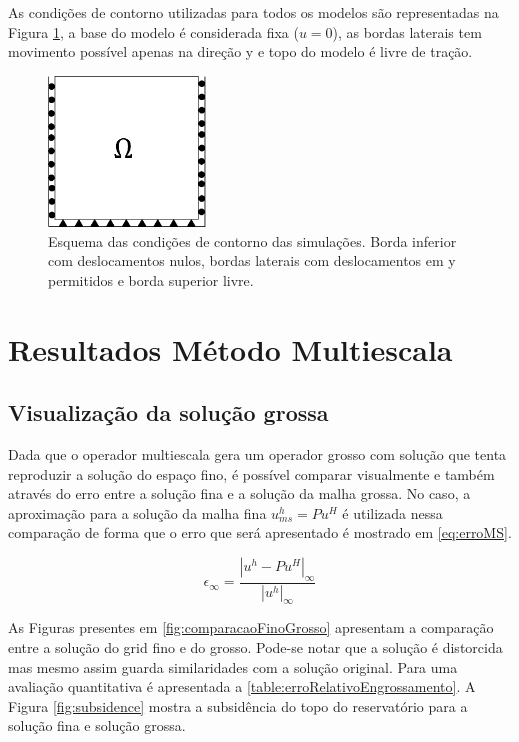 As condições de contorno utilizadas para todos os modelos são representadas na Figura \ref{fig:CondicoesContorno}, a base do modelo é considerada fixa ($u=0$), as bordas laterais tem movimento possível apenas na direção y e topo do modelo é livre de tração.

\begin{figure}[!htbp]
    \centering
    \includegraphics[height=4cm]{chap08/figs/CondicoesContorno.png}
    \caption{Esquema das condições de contorno das simulações. Borda inferior com deslocamentos nulos, bordas laterais com deslocamentos em y permitidos e borda superior livre.}
    \label{fig:CondicoesContorno}
\end{figure}


\section{Resultados Método Multiescala}

\subsection{Visualização da solução grossa}

Dada que o operador multiescala gera um operador grosso com solução que tenta reproduzir a solução do espaço fino, é possível comparar visualmente e também através do erro entre a solução fina e a solução da malha grossa. No caso, a aproximação para a solução da malha fina $u^h_{ms} = P u^H$ é utilizada nessa comparação de forma que o erro que será apresentado é mostrado em \eqref{eq:erroMS}.

\begin{equation}\label{eq:erroMS}
\epsilon_{\infty} =\frac{|u^h - P u^H|_{\infty}}{|u^h|_{\infty}}
\end{equation}


As Figuras presentes em \ref{fig:comparacaoFinoGrosso} apresentam a comparação entre a solução do grid fino e do grosso. Pode-se notar que a solução é distorcida mas mesmo assim guarda similaridades com a solução original. Para uma avaliação quantitativa é apresentada a \ref{table:erroRelativoEngrossamento}. A Figura \ref{fig:subsidence} mostra a subsidência do topo do reservatório para a solução fina e solução grossa.


